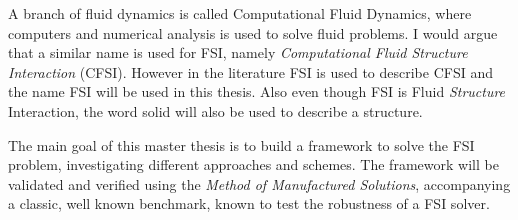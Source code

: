A branch of fluid dynamics is called Computational Fluid Dynamics, where computers and numerical analysis is used to solve fluid problems.
I would argue that a similar name is used for FSI, namely \textit{Computational Fluid Structure Interaction} (CFSI). However in the literature FSI is used to describe CFSI and the name FSI will be used in this thesis. Also even though FSI is Fluid \textit{Structure} Interaction, the word solid will also be used to describe a structure. \newline

The main goal of this master thesis is to build a framework to solve the FSI problem, investigating different approaches and schemes. The framework will be validated and verified using the \textit{Method of Manufactured Solutions}, accompanying a classic, well known benchmark, known to test the robustness of a FSI solver.

